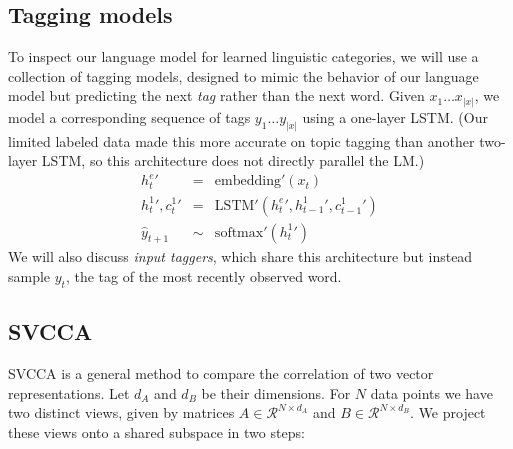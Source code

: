 \subsection{Tagging models}

To inspect our language model for learned linguistic categories, we will use a collection of tagging models, designed to mimic the behavior of our language model but predicting the next \emph{tag} rather than the next word. Given $x_1 \dots x_{|x|}$, we model a corresponding sequence of tags $y_1 \dots y_{|x|}$ using a one-layer LSTM. (Our limited labeled data made this more accurate on topic tagging than another two-layer LSTM, so this architecture does not directly parallel the LM.)
\begin{eqnarray}
h_t^e{}' &=& \textrm{embedding}'(x_{t}) \\
h_t^1{}', c_t^1{}' &=& \textrm{LSTM}'(h_t^e{}', h_{t-1}^1{}', c_{t-1}^1{}') \\
\hat{y}_{t+1} &\sim & \textrm{softmax}'(h_t^1{}')
\label{eq:tag_predictor_output}
\end{eqnarray}
We will also discuss \emph{input taggers}, which share this architecture but instead sample $y_t$, the tag of the most recently observed word. 

\subsection{SVCCA} \label{sec:svcca}


SVCCA is a general method to compare the correlation of two vector representations. Let $d_A$ and $d_B$ be their dimensions. For $N$ data points we have two distinct views, given by matrices $A \in \mathcal{R}^{N \times d_A}$ and $B \in \mathcal{R}^{N \times d_B}$. We project these views onto a shared subspace in two steps:

